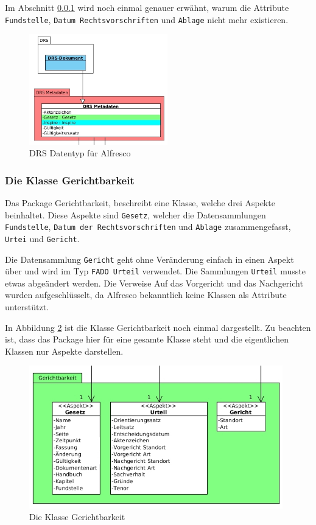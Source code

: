 Im Abschnitt \ref{Die Klasse Gerichtbarkeit} wird noch einmal genauer erw\"ahnt, warum die Attribute \texttt{Fundstelle}, \texttt{Datum Rechtsvorschriften} und \texttt{Ablage} nicht mehr existieren.

\begin{figure}[!ht]
\centering
\includegraphics[width=6cm]{Bilder/AlfrescoModell/DRS-Datentypen.jpg}
\caption{DRS Datentyp f\"ur Alfresco}
\label{DRS Datentyp f\"ur Alfresco}
\centering
\end{figure}

\subsubsection{Die Klasse Gerichtbarkeit}\label{Die Klasse Gerichtbarkeit}
Das Package Gerichtbarkeit, beschreibt eine Klasse, welche drei Aspekte beinhaltet. Diese Aspekte sind \texttt{Gesetz}, welcher die Datensammlungen \texttt{Fundstelle}, \texttt{Datum der Rechtsvorschriften} und \texttt{Ablage} zusammengefasst, \texttt{Urtei} und \texttt{Gericht}. 

Die Datensammlung \texttt{Gericht} geht ohne Ver\"anderung einfach in einen Aspekt \"uber und wird im Typ \texttt{FADO Urteil} verwendet. Die Sammlungen \texttt{Urteil} musste etwas abge\"andert werden. Die Verweise Auf das Vorgericht und das Nachgericht wurden aufgeschl\"usselt, da Alfresco bekanntlich keine Klassen als Attribute unterst\"utzt.

In Abbildung \ref{Klasse Gerichtbarkeit} ist die Klasse Gerichtbarkeit noch einmal dargestellt. Zu beachten ist, dass das Package hier f\"ur eine gesamte Klasse steht und die eigentlichen Klassen nur Aspekte darstellen.

\begin{figure}[!ht]
\centering
\includegraphics[width=11cm]{Bilder/AlfrescoModell/Gerichtbarkeit.jpg}
\caption{Die Klasse Gerichtbarkeit}
\label{Klasse Gerichtbarkeit}
\centering
\end{figure}

